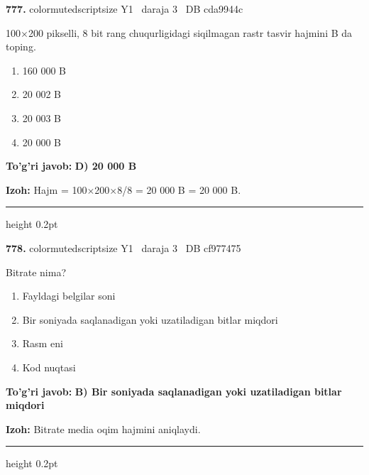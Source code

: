\documentclass[10pt,a4paper,oneside]{article}
\begin{document}
\noindent\textbf{\color{ink}777.}  {color{muted}scriptsize Y1 \textbullet\ daraja 3 \textbullet\ DB cda9944c}
\par
100\ensuremath{\times}200 pikselli, 8 bit rang chuqurligidagi siqilmagan rastr tasvir hajmini B da toping.
\begin{enumerate}[label=\Alph*),leftmargin=9mm]
\item 160 000 B
\item 20 002 B
\item 20 003 B
\item 20 000 B
\end{enumerate}
\begin{tcolorbox}[enhanced,breakable,colback=teal!4,colframe=teal!50!black,boxrule=0.5pt,arc=1.1mm,left=3mm,right=3mm,top=1.7mm,bottom=1.7mm,before skip=2mm,after skip=2mm]
\textbf{\color{teal}To'g'ri javob:} \textbf{D) 20 000 B}
\par\smallskip
\textbf{Izoh:} Hajm = 100\ensuremath{\times}200\ensuremath{\times}8/8 = 20 000 B = 20 000 B.
\end{tcolorbox}
\vspace{2mm}\hrule height 0.2pt \vspace{3mm}

\noindent\textbf{\color{ink}778.}  {color{muted}scriptsize Y1 \textbullet\ daraja 3 \textbullet\ DB cf977475}
\par
Bitrate nima?
\begin{enumerate}[label=\Alph*),leftmargin=9mm]
\item Fayldagi belgilar soni
\item Bir soniyada saqlanadigan yoki uzatiladigan bitlar miqdori
\item Rasm eni
\item Kod nuqtasi
\end{enumerate}
\begin{tcolorbox}[enhanced,breakable,colback=teal!4,colframe=teal!50!black,boxrule=0.5pt,arc=1.1mm,left=3mm,right=3mm,top=1.7mm,bottom=1.7mm,before skip=2mm,after skip=2mm]
\textbf{\color{teal}To'g'ri javob:} \textbf{B) Bir soniyada saqlanadigan yoki uzatiladigan bitlar miqdori}
\par\smallskip
\textbf{Izoh:} Bitrate media oqim hajmini aniqlaydi.
\end{tcolorbox}
\vspace{2mm}\hrule height 0.2pt \vspace{3mm}
\end{document}
